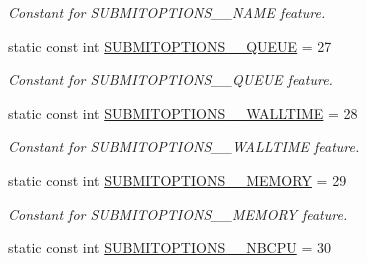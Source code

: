\begin{DoxyCompactItemize}
\begin{DoxyCompactList}\small\item\em Constant for SUBMITOPTIONS\_\-\_\-NAME feature. \item\end{DoxyCompactList}\item 
\hypertarget{classTMS__Data_1_1TMS__DataPackage_ad24edf2edc0ee70963767271e595fdf5}{
static const int \hyperlink{classTMS__Data_1_1TMS__DataPackage_ad24edf2edc0ee70963767271e595fdf5}{SUBMITOPTIONS\_\-\_\-QUEUE} = 27}
\label{classTMS__Data_1_1TMS__DataPackage_ad24edf2edc0ee70963767271e595fdf5}

\begin{DoxyCompactList}\small\item\em Constant for SUBMITOPTIONS\_\-\_\-QUEUE feature. \item\end{DoxyCompactList}\item 
\hypertarget{classTMS__Data_1_1TMS__DataPackage_a035709baf746b5aabef5eec321ce3db2}{
static const int \hyperlink{classTMS__Data_1_1TMS__DataPackage_a035709baf746b5aabef5eec321ce3db2}{SUBMITOPTIONS\_\-\_\-WALLTIME} = 28}
\label{classTMS__Data_1_1TMS__DataPackage_a035709baf746b5aabef5eec321ce3db2}

\begin{DoxyCompactList}\small\item\em Constant for SUBMITOPTIONS\_\-\_\-WALLTIME feature. \item\end{DoxyCompactList}\item 
\hypertarget{classTMS__Data_1_1TMS__DataPackage_af0bd3a694dbf0e3a74bdf8b115d48c02}{
static const int \hyperlink{classTMS__Data_1_1TMS__DataPackage_af0bd3a694dbf0e3a74bdf8b115d48c02}{SUBMITOPTIONS\_\-\_\-MEMORY} = 29}
\label{classTMS__Data_1_1TMS__DataPackage_af0bd3a694dbf0e3a74bdf8b115d48c02}

\begin{DoxyCompactList}\small\item\em Constant for SUBMITOPTIONS\_\-\_\-MEMORY feature. \item\end{DoxyCompactList}\item 
\hypertarget{classTMS__Data_1_1TMS__DataPackage_a737c8d3a37d1e4c4c60c3597efaf248c}{
static const int \hyperlink{classTMS__Data_1_1TMS__DataPackage_a737c8d3a37d1e4c4c60c3597efaf248c}{SUBMITOPTIONS\_\-\_\-NBCPU} = 30}
\label{classTMS__Data_1_1TMS__DataPackage_a737c8d3a37d1e4c4c60c3597efaf248c}


\end{DoxyCompactItemize}

